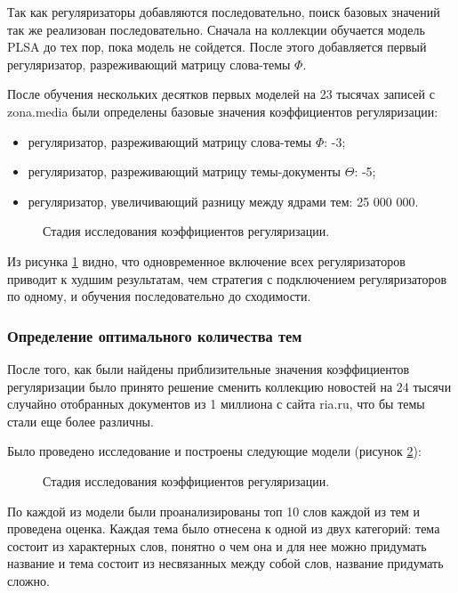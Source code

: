 Так как регуляризаторы добавляются последовательно, поиск базовых значений так же реализован последовательно. Сначала на коллекции обучается модель PLSA до тех пор, пока модель не сойдется. После этого добавляется первый регуляризатор, разреживающий матрицу слова-темы $\Phi$.

После обучения нескольких десятков первых моделей на 23 тысячах записей с zona.media были определены базовые значения коэффициентов регуляризации:

\begin{itemize}
    \item регуляризатор, разреживающий матрицу слова-темы $\Phi$: -3;
    \item регуляризатор, разреживающий матрицу темы-документы $\Theta$: -5;
    \item регуляризатор, увеличивающий разницу между ядрами тем: 25 000 000.
\end{itemize}

\begin{figure}[h]
    \caption{Стадия исследования коэффициентов регуляризации.}
    \label{fig:res_table_1}
\end{figure}

Из рисунка \ref{fig:res_table_1} видно, что одновременное включение всех регуляризаторов приводит к худшим результатам, чем стратегия с подключением регуляризаторов по одному, и обучения последовательно до сходимости.
\subsubsection{Определение оптимального количества тем}

После того, как были найдены приблизительные значения коэффициентов регуляризации было принято решение сменить коллекцию новостей на 24 тысячи случайно отобранных документов из 1 миллиона с сайта ria.ru, что бы темы стали еще более различны.

Было проведено исследование и построены следующие модели (рисунок \ref{fig:res_table_2}):


\begin{figure}[h]
    \caption{Стадия исследования коэффициентов регуляризации.}
    \label{fig:res_table_2}
\end{figure}

По каждой из модели были проанализированы топ 10 слов каждой из тем и проведена оценка. Каждая тема было отнесена к одной из двух категорий: тема состоит из характерных слов, понятно о чем она и для нее можно придумать название и тема состоит из несвязанных между собой слов, название придумать сложно.



